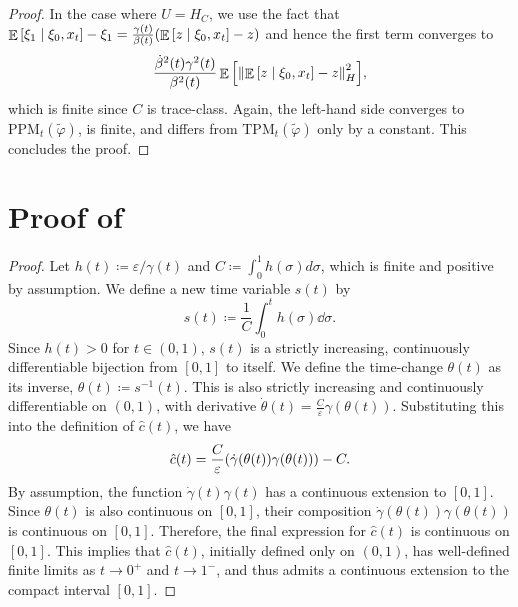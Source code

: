 \begin{proof}
  In the case where \(U = H_{C}\), we use the fact that \(\mathop{\mathbb{E}}\qty[\xi_{1} \mid \xi_{0}, x_{t}] - \xi_{1} = \frac{\gamma(t)}{\beta(t)}\qty(\mathop{\mathbb{E}}\qty[z \mid \xi_{0}, x_{t}] - z)\) and hence the first term converges to
  \[
    \frac{\dot{\beta}^{2}(t) \gamma^{2}(t)}{\beta^{2}(t)} \mathop{\mathbb{E}}\qty[\norm{\mathop{\mathbb{E}}\qty[z \mid \xi_{0}, x_{t}] - z}^{2}_{H}],
  \]
  which is finite since \(C\) is trace-class. Again, the left-hand side converges to \(\mathrm{PPM}_{t}(\widetilde{\varphi})\), is finite, and differs from \(\mathrm{TPM}_{t}(\widetilde{\varphi})\) only by a constant. This concludes the proof.
\end{proof}

\section{Proof of } \label{prf:lem:tc}
\restatelemtc*
\begin{proof}
  Let \(h(t) \coloneqq \varepsilon/\gamma(t)\) and \(C \coloneqq \int_0^1 h(\sigma) d\sigma\), which is finite and positive by assumption. We define a new time variable \(s(t)\) by
  \[ s(t) \coloneqq \frac{1}{C} \int_{0}^{t} h(\sigma) \dd{\sigma}. \]
  Since \(h(t) > 0\) for \(t \in (0, 1)\), \(s(t)\) is a strictly increasing, continuously differentiable bijection from \([0, 1]\) to itself. We define the time-change \(\theta(t)\) as its inverse, \(\theta(t) \coloneqq s^{-1}(t)\). This is also strictly increasing and continuously differentiable on \((0, 1)\), with derivative \(
  \dot{\theta}(t) = \frac{C}{\varepsilon} \gamma(\theta(t))\).
  Substituting this into the definition of \(\hat{c}(t)\), we have
  \[
    \hat{c}(t) = \frac{C}{\varepsilon} \qty(\dot{\gamma}(\theta(t)) \gamma(\theta(t))) - C.
  \]
  By assumption, the function \(\dot{\gamma}(t)\gamma(t)\) has a continuous extension to \([0, 1]\). Since \(\theta(t)\) is also continuous on \([0, 1]\), their composition \(\dot{\gamma}(\theta(t))\gamma(\theta(t))\) is continuous on \([0, 1]\). Therefore, the final expression for \(\hat{c}(t)\) is continuous on \([0, 1]\). This implies that \(\hat{c}(t)\), initially defined only on \((0, 1)\), has well-defined finite limits as \(t \to 0^+\) and \(t \to 1^-\), and thus admits a continuous extension to the compact interval \([0, 1]\).
\end{proof}

